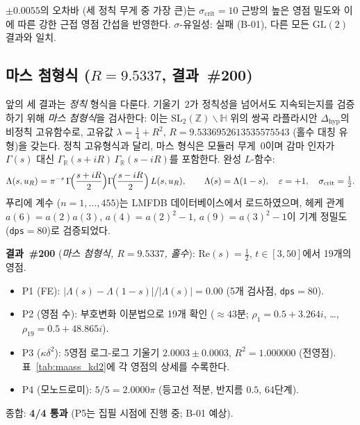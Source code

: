 \documentclass[11pt, a4paper]{article}
\theoremstyle{plain}
\theoremstyle{definition}
\begin{document}
$\pm 0.0055$의 오차바 (세 정칙 무게 중 가장 큰)는
$\sigma_{\mathrm{crit}}=10$ 근방의 높은 영점 밀도와
이에 따른 강한 근접 영점 간섭을 반영한다.
$\sigma$-유일성: 실패 (B-01), 다른 모든 $\mathrm{GL}(2)$ 결과와 일치.

\subsection{마스 첨형식 ($R=9.5337$, 결과~\#200)}
\label{ssec:maass}

앞의 세 결과는 \emph{정칙} 형식을 다룬다. 기울기~$2$가 정칙성을
넘어서도 지속되는지를 검증하기 위해 \emph{마스 첨형식}을 검사한다:
이는 $\mathrm{SL}_2(\mathbb{Z})\backslash\mathbb{H}$ 위의 쌍곡
라플라시안 $\Delta_{\mathrm{hyp}}$의 비정칙 고유함수로,
고유값 $\lambda = \tfrac{1}{4}+R^2$, $R=9.5336952613535575543$
(홀수 대칭 유형)을 갖는다.
정칙 고유형식과 달리, 마스 형식은 모듈러 무게~$0$이며
감마 인자가 $\Gamma(s)$ 대신
$\Gamma_{\mathbb{R}}(s+iR)\,\Gamma_{\mathbb{R}}(s-iR)$를 포함한다.
완성 $L$-함수:
\[
  \Lambda(s,u_R) = \pi^{-s}\,
  \Gamma\!\Bigl(\frac{s+iR}{2}\Bigr)
  \Gamma\!\Bigl(\frac{s-iR}{2}\Bigr)\,L(s,u_R), \qquad
  \Lambda(s)=\Lambda(1-s), \quad \varepsilon=+1, \quad
  \sigma_{\mathrm{crit}}=\tfrac{1}{2}.
\]
푸리에 계수 ($n=1,\ldots,455$)는 LMFDB 데이터베이스에서 로드하였으며,
헤케 관계 $a(6)=a(2)a(3)$, $a(4)=a(2)^2-1$, $a(9)=a(3)^2-1$이
기계 정밀도 (\texttt{dps}$=80$)로 검증되었다.

\medskip
\noindent\textbf{결과~\#200} (\textit{마스 첨형식, $R=9.5337$, 홀수}):
$\mathrm{Re}(s)=\tfrac{1}{2}$, $t\in[3,50]$에서 19개의 영점.

\begin{itemize}
  \item P1 (FE): $|\Lambda(s)-\Lambda(1-s)|/|\Lambda(s)|=0.00$ (5개 검사점,
        \texttt{dps}$=80$).
  \item P2 (영점 수): 부호변화 이분법으로 19개 확인
        ($\approx 43$분; $\rho_1=0.5+3.264i$, \ldots, $\rho_{19}=0.5+48.865i$).
  \item P3 ($\kappa\delta^{2}$): 5영점 로그-로그 기울기
        $\mathbf{2.0003\pm 0.0003}$, $R^{2}=1.000000$ (전영점).
        표~\ref{tab:maass_kd2}에 각 영점의 상세를 수록한다.
  \item P4 (모노드로미): $5/5=2.0000\pi$ (등고선 적분, 반지름 $0.5$,
        64단계).
\end{itemize}
종합: \textbf{4/4 통과} (P5는 집필 시점에 진행 중; B-01 예상).
\end{document}
